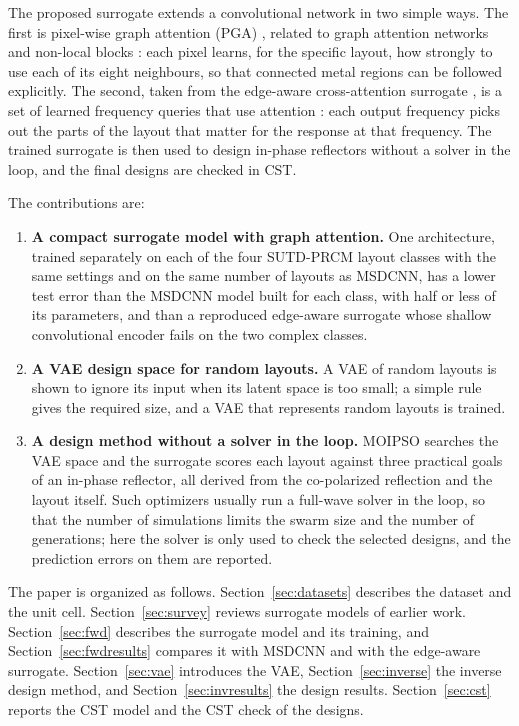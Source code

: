 \documentclass[journal]{IEEEtran}
\begin{document}
The proposed surrogate extends a convolutional network in two simple ways. The first is pixel-wise graph attention (PGA) \cite{pganet}, related to graph attention networks \cite{gat} and non-local blocks \cite{nonlocal}: each pixel learns, for the specific layout, how strongly to use each of its eight neighbours, so that connected metal regions can be followed explicitly. The second, taken from the edge-aware cross-attention surrogate \cite{edgeaware}, is a set of learned frequency queries that use attention \cite{vaswani}: each output frequency picks out the parts of the layout that matter for the response at that frequency. The trained surrogate is then used to design in-phase reflectors without a solver in the loop, and the final designs are checked in CST.

The contributions are:
\begin{enumerate}
\item \textbf{A compact surrogate model with graph attention.} One architecture, trained separately on each of the four SUTD-PRCM layout classes with the same settings and on the same number of layouts as MSDCNN, has a lower test error than the MSDCNN model built for each class, with half or less of its parameters, and than a reproduced edge-aware surrogate whose shallow convolutional encoder fails on the two complex classes.
\item \textbf{A VAE design space for random layouts.} A VAE of random layouts is shown to ignore its input when its latent space is too small; a simple rule gives the required size, and a VAE that represents random layouts is trained.
\item \textbf{A design method without a solver in the loop.} MOIPSO \cite{moipso} searches the VAE space and the surrogate scores each layout against three practical goals of an in-phase reflector, all derived from the co-polarized reflection and the layout itself. Such optimizers usually run a full-wave solver in the loop, so that the number of simulations limits the swarm size and the number of generations; here the solver is only used to check the selected designs, and the prediction errors on them are reported.
\end{enumerate}

The paper is organized as follows. Section~\ref{sec:datasets} describes the dataset and the unit cell. Section~\ref{sec:survey} reviews surrogate models of earlier work. Section~\ref{sec:fwd} describes the surrogate model and its training, and Section~\ref{sec:fwdresults} compares it with MSDCNN and with the edge-aware surrogate. Section~\ref{sec:vae} introduces the VAE, Section~\ref{sec:inverse} the inverse design method, and Section~\ref{sec:invresults} the design results. Section~\ref{sec:cst} reports the CST model and the CST check of the designs.
\end{document}
